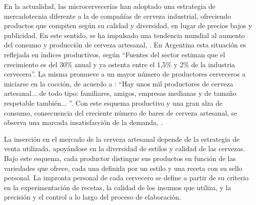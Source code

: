     \par
    En la actualidad, las microcervecerías han adoptado una estrategia de mercadotecnia diferente a la de compañías de cerveza industrial, ofreciendo productos que compiten según su calidad y diversidad, en lugar de precios bajos y publicidad. En este sentido, se ha  impulsado una tendencia mundial al aumento del consumo y producción de cerveza artesanal, \cite{Calvillo17}. En Argentina esta situación es reflejada en índices productivos, según \cite{Cuculiansky17} “Fuentes del sector estiman que el crecimiento es del 30\% anual y ya ostenta entre el 1,5\% y 2\% de la industria cervecera”. La misma promueve a un mayor número de productores cerveceros a iniciarse en la cocción, de acuerdo a \cite{Aizen17}: “Hay unos mil productores de cerveza artesanal... de todo tipo: familiares, amigos, empresas medianas y de tamaño respetable también... ”. Con este esquema productivo y una gran alza de consumo, consecuencia del creciente número de bares de cerveza artesanal, se observa una marcada insatisfacción de la demanda, \cite{Rios16}.
    \par
    La inserción en el mercado de la cerveza artesanal depende de la estrategia de venta utilizada, apoyándose en la diversidad de estilos y calidad de las cervezas. Bajo este esquema, cada productor distingue sus productos en función de las variedades que ofrece, cada una definida por un estilo y una receta con su sello personal. La impronta personal de cada cervecero se define a partir de su criterio en la experimentación de recetas, la calidad de los insumos que utiliza, y la precisión y el control a lo largo del proceso de elaboración.
    

